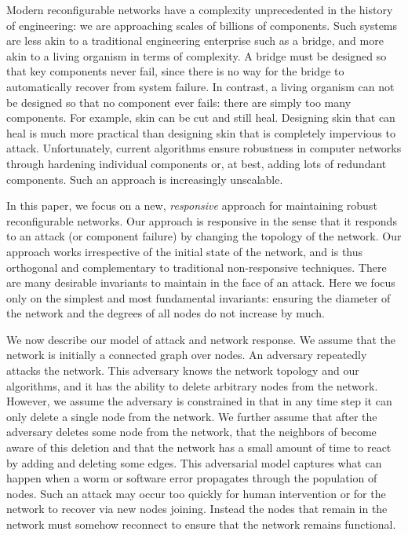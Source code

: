 \documentclass[11pt]{article}
\begin{document}
Modern reconfigurable networks have a complexity unprecedented in the history
of engineering: we are approaching scales of billions of components.
Such systems are less akin to a traditional engineering enterprise
such as a bridge, and more akin to a living organism in terms of
complexity.  A bridge must be designed so that key components never
fail, since there is no way for the bridge to automatically recover
from system failure.  In contrast, a living organism can not be
designed so that no component ever fails: there are simply too many
components.  For example, skin can be cut and still heal. Designing
skin that can heal is much more practical than designing skin that is
completely impervious to attack.  Unfortunately, current algorithms
ensure robustness in computer networks through hardening individual
components or, at best, adding lots of redundant components.  Such an
approach is increasingly unscalable.

In this paper, we focus on a new, \emph{responsive} approach for
maintaining robust reconfigurable networks.  Our approach is responsive in the sense
that it responds to an attack (or component failure) by changing the
topology of the network.  Our approach works irrespective of the
initial state of the network, and is thus orthogonal and complementary
to traditional non-responsive techniques.  There are many desirable
invariants to maintain in the face of an attack.  Here we focus only on
 the simplest and most fundamental invariants: ensuring the diameter of the network 
and the degrees of all nodes do not increase by much.


\medskip
{} We now describe our model of attack and
network response.  We assume that the network is initially a connected
graph over  nodes.  An adversary repeatedly attacks the
network.  This adversary knows the network topology and our
algorithms, and it has the ability to delete arbitrary nodes from the
network.  However, we assume the adversary is constrained in that in
any time step it can only delete a single node from the network.  We
further assume that after the adversary deletes some node  from the
network, that the neighbors of  become aware of this deletion and
that the network has a small amount of time to react by adding and deleting some
edges.  This adversarial model captures what can happen when a
worm or software error propagates through the population of nodes.
Such an attack may occur too quickly for human intervention or for the
network to recover via new nodes joining.  Instead the nodes that
remain in the network must somehow reconnect to ensure that the
network remains functional.
\end{document}
